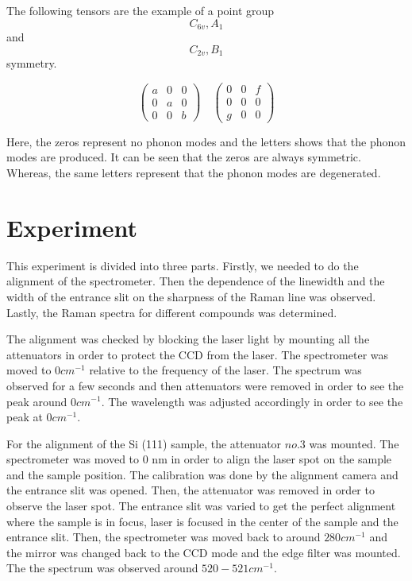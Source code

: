 \documentclass[openany,11pt,a4paper]{report}
\begin{document}
The following tensors are the example of a point group $$
C_{6 v}, A_{1}
$$ and $$
C_{2 v}, B_{1}
$$ symmetry.

$$
\left(\begin{array}{lll}{a} & {0} & {0} \\ {0} & {a} & {0} \\ {0} & {0} & {b}\end{array}\right) \quad\left(\begin{array}{lll}{0} & {0} & {f} \\ {0} & {0} & {0} \\ {g} & {0} & {0}\end{array}\right)
$$


Here, the zeros represent no phonon modes and the letters shows that the phonon modes are produced. It can be seen that the zeros are always symmetric. Whereas, the same letters represent that the phonon modes are degenerated. \cite{bib1}

\section{Experiment}

This experiment is divided into three parts. Firstly, we needed to do the alignment of the spectrometer. Then the dependence of the linewidth and the width of the entrance slit on the sharpness of the Raman line was observed. Lastly, the Raman spectra for different compounds was determined. 

The alignment was checked by blocking the laser light by mounting all the attenuators in order to protect the CCD from the laser. The spectrometer was moved to $0 cm^{-1}$ relative to the frequency of the laser. The spectrum was observed for a few seconds and then attenuators were removed in order to see the peak around $0 cm^{-1}$. The wavelength was adjusted accordingly in order to see the peak at $0cm^{-1}$.

For the alignment of the Si (111) sample, the attenuator $no.3$ was mounted. The spectrometer was moved to 0 nm in order to align the laser spot on the sample and the sample position. The calibration was done by the alignment camera and the entrance slit was opened. Then, the attenuator was removed in order to observe the laser spot. The entrance slit was varied to get the perfect alignment where the sample is in focus, laser is focused in the center of the sample and the entrance slit. Then, the spectrometer was moved back to around $280 cm^{-1}$ and the mirror was changed back to the CCD mode and the edge filter was mounted. The the spectrum was observed around $520-521 cm^{-1}$. 
\end{document}
